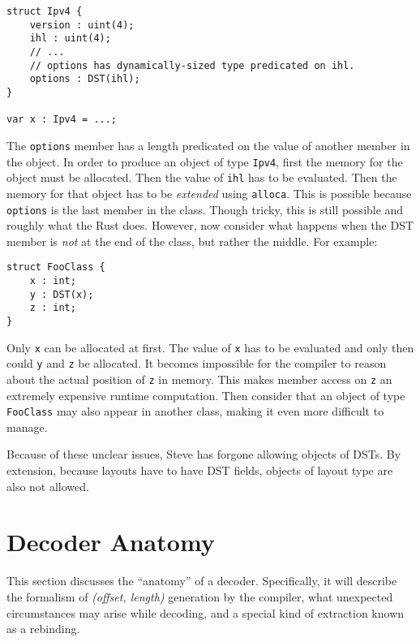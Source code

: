 \begin{codepage}
\begin{lstlisting}
struct Ipv4 {
	version : uint(4);
	ihl : uint(4);
	// ...
	// options has dynamically-sized type predicated on ihl.
	options : DST(ihl); 
}

var x : Ipv4 = ...;
\end{lstlisting}
\end{codepage}

The \texttt{options} member has a length predicated on the value
of another member in the object. In order to produce an object of type \texttt{Ipv4},
first the memory for the object must be allocated. Then the value of \texttt{ihl}
has to be evaluated. Then the memory for that object has to be \emph{extended}
using \texttt{alloca}. This is possible because \texttt{options} is the last member in the class. Though tricky, this is still possible and roughly what the Rust does.
However, now consider what happens when the DST member is \emph{not} at the end
of the class, but rather the middle. For example:

\begin{codepage}
\begin{lstlisting}
struct FooClass {
	x : int;
	y : DST(x);
	z : int;
}
\end{lstlisting}
\end{codepage}

Only \texttt{x} can be allocated at first. The value of \texttt{x} has to be evaluated
and only then could \texttt{y} and \texttt{z} be allocated. It becomes impossible
for the compiler to reason about the actual position of \texttt{z} in memory. This 
makes member access on \texttt{z} an extremely expensive runtime computation.
Then consider that an object of type \texttt{FooClass} may also appear in
another class, making it even more difficult to manage.

Because of these unclear issues, Steve has forgone allowing objects of DSTs.
By extension, because layouts have to have DST fields, objects of layout type
are also not allowed.


\section{Decoder Anatomy} \label{decoder_anatomy}

This section discusses the ``anatomy'' of a decoder.
Specifically, it will describe the formalism of \textit{(offset, length)} generation by the compiler, what unexpected circumstances
may arise while decoding, and a special kind of extraction known
as a rebinding.

